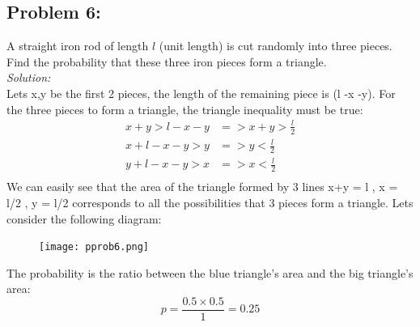 \documentclass[a4paper]{article}
\begin{document}
\subsection*{Problem 6:}
A straight iron rod of length $l$ (unit length) is cut randomly into three pieces. Find the probability that these three iron pieces form a triangle. \\
\textit{Solution: } \\
Lets x,y be the first 2 pieces, the length of the remaining piece is (l -x -y).
For the three pieces to form a triangle, the triangle inequality must be true:
\begin{align*}
	x + y > l- x -y   & => x+y > \frac{l}{2} \\
	x + l -x -y > y   & => y < \frac{l}{2}   \\
	y + l - x - y > x & => x < \frac{l}{2}   \\
\end{align*}
We can easily see that the area of the triangle formed by 3 lines x+y = l , x = l/2 , y = l/2 corresponds to all the possibilities that 3 pieces form a triangle. Lets consider the following diagram:
\begin{figure}[H]
	\centering
	\texttt{[image: pprob6.png]}
\end{figure}
The probability is the ratio between the blue triangle's area and the big triangle's area:
\begin{equation*}
	p = \frac{0.5 \times 0.5}{1} = 0.25 
\end{equation*}
\end{document}
